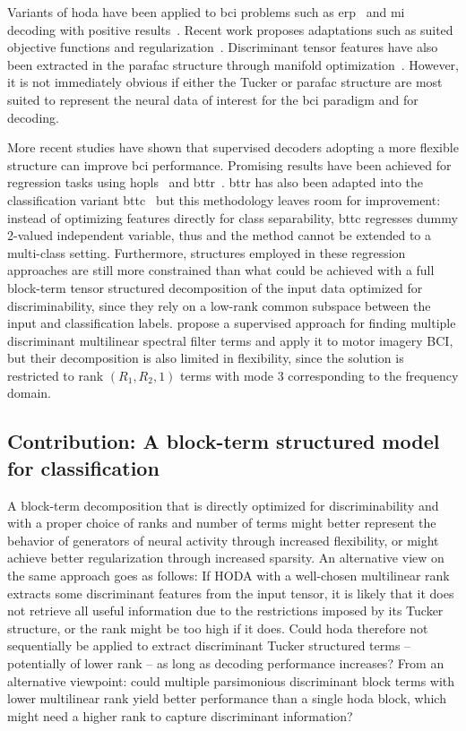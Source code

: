 \documentclass[twocolumn]{article}
\begin{document}
Variants of \ac{hoda} have been applied to \ac{bci} problems such as
\ac{erp}~\cite{Onishi2012,Higashi2016} and \ac{mi}~\cite{Liu2015,Cai2021}
decoding with positive results~\cite{Lotte2018}.
Recent work proposes adaptations such as suited objective
functions and regularization~\cite{JamshidiIdaji2017,Jorajuria2022,Aghili2023}.
Discriminant tensor features have also been extracted
in the \ac{parafac} structure through manifold optimization~\cite{Froelich2018}.
However, it is not immediately obvious if either the Tucker or \ac{parafac}
structure are most suited to represent the neural data of interest for the
\ac{bci}
paradigm and for decoding.

More recent studies have shown that supervised decoders adopting a more flexible structure
can improve \ac{bci} performance.
Promising results have been achieved for regression tasks using
\ac{hopls}~\cite{Zhao2012,Camarrone2018} and \ac{bttr}~\cite{Faes2022,Faes2022a}.
\ac{bttr} has also been adapted into the classification variant \ac{bttc}~\cite{Camarrone2021}
but this methodology leaves room for improvement:
instead of optimizing features directly for class separability, \ac{bttc} regresses
dummy 2-valued independent variable, thus and the method
cannot be extended to a multi-class setting.
Furthermore, structures employed in these regression approaches are still more constrained
than what could be achieved with a full block-term tensor structured decomposition of the input data optimized for discriminability, since they rely on a low-rank common subspace
between the input and classification labels.
\textcite{Huang2020} propose a supervised approach for finding multiple discriminant
multilinear spectral filter terms and apply it to motor imagery BCI, but their
decomposition is also limited in flexibility, since the solution is
restricted to rank $(R_1,R_2,1)$ terms with mode 3 corresponding to the frequency domain.

\subsection{Contribution: A block-term structured model for classification}

A block-term decomposition that is directly optimized for discriminability and with a
proper choice of ranks and number of terms might better represent the behavior
of generators of neural activity through increased flexibility, or might
achieve better regularization through increased sparsity.
An alternative view on the same approach goes as follows:
If HODA with a well-chosen multilinear rank extracts some discriminant features
from the input tensor, it is likely that it does not retrieve all useful
information due to the restrictions imposed by its Tucker structure, or the rank
might be too high if it does.
Could \ac{hoda} therefore not sequentially be applied to extract discriminant
Tucker structured terms -- potentially of lower rank -- as long as decoding
performance increases?
From an alternative viewpoint: could multiple parsimonious discriminant block terms with lower
multilinear rank yield better performance than a single \ac{hoda} block, which
might need a higher rank to capture discriminant information?
\end{document}
